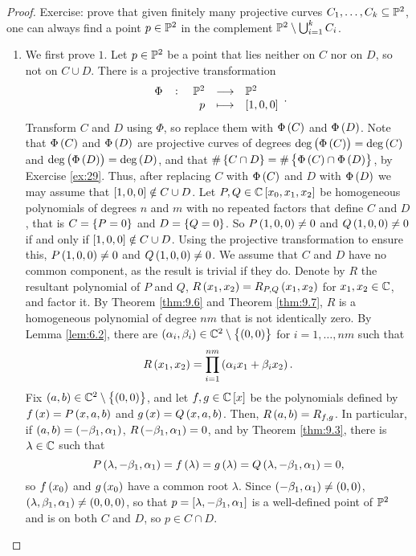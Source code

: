 \begin{proof}
Exercise: prove that given finitely many projective curves $ C_1, \dots, C_k \subseteq \P^2 $, one can always find a point $ p \in \P^2 $ in the complement $ \P^2 \setminus \bigcup_{i = 1}^k C_i $.
\begin{enumerate}
\item We first prove $ 1 $. Let $ p \in \P^2 $ be a point that lies neither on $ C $ nor on $ D $, so not on $ C \cup D $. There is a projective transformation
$$ \function[\Phi]{\P^2}{\P^2}{p}{\sbr{1, 0, 0}}. $$
Transform $ C $ and $ D $ using $ \Phi $, so replace them with $ \Phi\br{C} $ and $ \Phi\br{D} $. Note that $ \Phi\br{C} $ and $ \Phi\br{D} $ are projective curves of degrees $ \deg\br{\Phi\br{C}} = \deg\br{C} $ and $ \deg\br{\Phi\br{D}} = \deg\br{D} $, and that $ \#\cbr{C \cap D} = \#\cbr{\Phi\br{C} \cap \Phi\br{D}} $, by Exercise \ref{ex:29}. Thus, after replacing $ C $ with $ \Phi\br{C} $ and $ D $ with $ \Phi\br{D} $ we may assume that $ \sbr{1, 0, 0} \notin C \cup D $. Let $ P, Q \in \C\sbr{x_0, x_1, x_2} $ be homogeneous polynomials of degrees $ n $ and $ m $ with no repeated factors that define $ C $ and $ D $, that is $ C = \cbr{P = 0} $ and $ D = \cbr{Q = 0} $. So $ P\br{1, 0, 0} \ne 0 $ and $ Q\br{1, 0, 0} \ne 0 $ if and only if $ \sbr{1, 0, 0} \notin C \cup D $. Using the projective transformation to ensure this, $ P\br{1, 0, 0} \ne 0 $ and $ Q\br{1, 0, 0} \ne 0 $. We assume that $ C $ and $ D $ have no common component, as the result is trivial if they do. Denote by $ R $ the resultant polynomial of $ P $ and $ Q $, $ R\br{x_1, x_2} = R_{P, Q}\br{x_1, x_2} $ for $ x_1, x_2 \in \C $, and factor it. By Theorem \ref{thm:9.6} and Theorem \ref{thm:9.7}, $ R $ is a homogeneous polynomial of degree $ nm $ that is not identically zero. By Lemma \ref{lem:6.2}, there are $ \br{\alpha_i, \beta_i} \in \C^2 \setminus \cbr{\br{0, 0}} $ for $ i = 1, \dots, nm $ such that
$$ R\br{x_1, x_2} = \prod_{i = 1}^{nm} \br{\alpha_ix_1 + \beta_ix_2}. $$
Fix $ \br{a, b} \in \C^2 \setminus \cbr{\br{0, 0}} $, and let $ f, g \in \C\sbr{x} $ be the polynomials defined by $ f\br{x} = P\br{x, a, b} $ and $ g\br{x} = Q\br{x, a, b} $. Then, $ R\br{a, b} = R_{f, g} $. In particular, if $ \br{a, b} = \br{-\beta_1, \alpha_1} $, $ R\br{-\beta_1, \alpha_1} = 0 $, and by Theorem \ref{thm:9.3}, there is $ \lambda \in \C $ such that
$$ P\br{\lambda, -\beta_1, \alpha_1} = f\br{\lambda} = g\br{\lambda} = Q\br{\lambda, -\beta_1, \alpha_1} = 0, $$
so $ f\br{x_0} $ and $ g\br{x_0} $ have a common root $ \lambda $. Since $ \br{-\beta_1, \alpha_1} \ne \br{0, 0} $, $ \br{\lambda, \beta_1, \alpha_1} \ne \br{0, 0, 0} $, so that $ p = \sbr{\lambda, -\beta_1, \alpha_1} $ is a well-defined point of $ \P^2 $ and is on both $ C $ and $ D $, so $ p \in C \cap D $.


\end{enumerate}
\end{proof}
